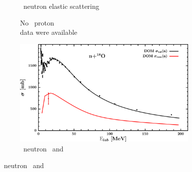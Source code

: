 \begin{figure}[hbtp]
\begin{subfigure}[c]{0.39\textheight}
        \caption{\oEight\ neutron elastic scattering}
        \label{DOMFitData_o18_neutron_elastic}
    \end{subfigure}\vspace{0.70in}
    \begin{subfigure}[c]{0.45\textwidth}
        \centering
        \caption{No \oEight\ proton \rxn\\ data were available}
        \label{DOMFitData_o18_proton_inelastic}
    \end{subfigure}\hspace{6pt}
    \begin{subfigure}[c]{0.45\textwidth}
        \centering
        \includegraphics[width=\linewidth]{figures/o18_neutronInelastic.png}
        \caption{\oEight\ neutron \rxn\ and \tot}
        \label{DOMFitData_o18_neutron_inelastic}
    \end{subfigure}
\end{figure}

\afterpage{\clearpage}

